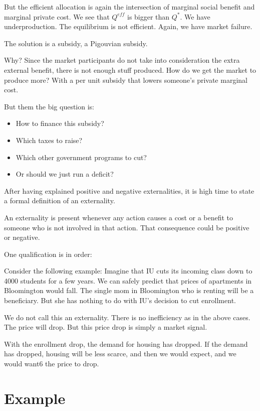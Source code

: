 \documentclass[
]{book}
\providecommand{\tightlist}{%
  \setlength{\itemsep}{0pt}\setlength{\parskip}{0pt}}
\begin{document}
But the efficient allocation is again the intersection of marginal social benefit and marginal private cost. We see that \(Q^{eff}\) is bigger than \(Q^*\). We have underproduction. The equilibrium is not efficient. Again, we have market failure.

The solution is a subsidy, a Pigouvian subsidy.

Why? Since the market participants do not take into consideration the extra external benefit, there is not enough stuff produced. How do we get the market to produce more? With a per unit subsidy that lowers someone's private marginal cost.

But them the big question is:

\begin{itemize}
\tightlist
\item
  How to finance this subsidy?
\item
  Which taxes to raise?
\item
  Which other government programs to cut?
\item
  Or should we just run a deficit?
\end{itemize}

After having explained positive and negative externalities, it is high time to state a formal definition of an externality.

An externality is present whenever any action causes a cost or a benefit to someone who is not involved in that action. That consequence could be positive or negative.

One qualification is in order:

Consider the following example: Imagine that IU cuts its incoming class down to 4000 students for a few years. We can safely predict that prices of apartments in Bloomington would fall. The single mom in Bloomington who is renting will be a beneficiary. But she has nothing to do with IU's decision to cut enrollment.

We do not call this an externality. There is no inefficiency as in the above cases. The price will drop. But this price drop is simply a market signal.

With the enrollment drop, the demand for housing has dropped. If the demand has dropped, housing will be less scarce, and then we would expect, and we would want6 the price to drop.

\hypertarget{example}{%
\section{Example}\label{example}}
\end{document}
